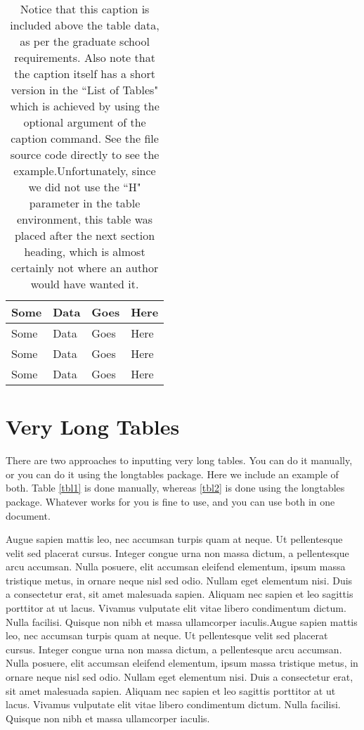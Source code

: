 \begin{table}[h]
\caption[A proper table caption location]{Notice that this caption is included above the table data, as per the graduate school requirements. Also note that the caption itself has a short version in the ``List of Tables" which is achieved by using the optional argument of the caption command. See the file source code directly to see the example.Unfortunately, since we did not use the ``H" parameter in the table environment, this table was placed after the next section heading, which is almost certainly not where an author would have wanted it.}
\begin{tabularx}{\textwidth}{XXXX}\hline
Some    & Data  & Goes  & Here\\\hline
Some    & Data  & Goes  & Here\\
Some    & Data  & Goes  & Here\\
Some    & Data  & Goes  & Here\\\hline
\end{tabularx}
\end{table}

\section{Very Long Tables}

There are two approaches to inputting very long tables. You can do it manually, or you can do it using the longtables package. Here we include an example of both. Table \ref{tbl1} is done manually, whereas \ref{tbl2} is done using the longtables package. Whatever works for you is fine to use, and you can use both in one document. 

Augue sapien mattis leo, nec accumsan turpis quam at neque. Ut pellentesque velit sed placerat cursus. Integer congue urna non massa dictum, a pellentesque arcu accumsan. Nulla posuere, elit accumsan eleifend elementum, ipsum massa tristique metus, in ornare neque nisl sed odio. Nullam eget elementum nisi. Duis a consectetur erat, sit amet malesuada sapien. Aliquam nec sapien et leo sagittis porttitor at ut lacus. Vivamus vulputate elit vitae libero condimentum dictum. Nulla facilisi. Quisque non nibh et massa ullamcorper iaculis.Augue sapien mattis leo, nec accumsan turpis quam at neque. Ut pellentesque velit sed placerat cursus. Integer congue urna non massa dictum, a pellentesque arcu accumsan. Nulla posuere, elit accumsan eleifend elementum, ipsum massa tristique metus, in ornare neque nisl sed odio. Nullam eget elementum nisi. Duis a consectetur erat, sit amet malesuada sapien. Aliquam nec sapien et leo sagittis porttitor at ut lacus. Vivamus vulputate elit vitae libero condimentum dictum. Nulla facilisi. Quisque non nibh et massa ullamcorper iaculis.

